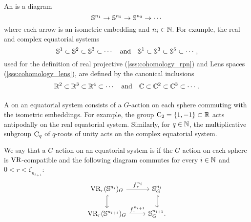 \subsubsection{}
\label{subsub:VR-compatible-system}
An  is a diagram
\[
\mathbb{S}^{n_1} \to \mathbb{S}^{n_2} \to \mathbb{S}^{n_3} \to \dotsb
\]
where each arrow is an isometric embedding and $n_i \in \mathbb{N}$.
For example, the real and complex equatorial systems
\[
\mathbb{S}^1 \subset \mathbb{S}^2 \subset \mathbb{S}^3 \subset \dotsb
\quad\text{and}\quad
\mathbb{S}^1 \subset \mathbb{S}^3 \subset \mathbb{S}^5 \subset \dotsb,
\]
used for the definition of real projective (\cref{sss:cohomology_rpn}) and Lens spaces (\cref{sss:cohomology_lens}), are defined by the canonical inclusions
\[
\mathbb{R}^2 \subset \mathbb{R}^3 \subset \mathbb{R}^4 \subset \dotsb
\quad\text{and}\quad
\mathbb{C} \subset \mathbb{C}^2 \subset \mathbb{C}^3 \subset \dotsb.
\]

\subsubsection{}
\label{subsub:system VR compatible}

A  on an equatorial system consists of a \(G\)-action on each sphere commuting with the isometric embeddings.
For example, the group \(\mathrm{C}_2 = \{1,-1\} \subset \mathbb{R}\) acts antipodally on the real equatorial system.
Similarly, for \(q \in \mathbb{N}\), the multiplicative subgroup \(\mathrm{C}_q\) of \(q\)-roots of unity acts on the complex equatorial system.

We say that a \(G\)-action on an equatorial system is  if the \(G\)-action on each sphere is \(\mathrm{VR}\)-compatible and the following diagram commutes for every \(i \in \mathbb{N}\) and $0 < r < \zeta_{n_{i+1}}$:
\begin{equation}\label{eq:VR_quotient}
    \begin{tikzcd}
	\VR_r(\bS^{n_i})_G
	\ar[d, hook]
	\ar[r, "\tilde f_{\,r}^{\,n_i}" above]
	&
	\bS^{n_i}_G
	\ar[d, hook]
	\\
	\VR_r(\bS^{n_{i+1}})_G
	\ar[r, "\tilde f_{\,r}^{\,n_{i+1}}" above]
	&
	\bS^{n_{i+1}}_G.
\end{tikzcd}
\end{equation}



